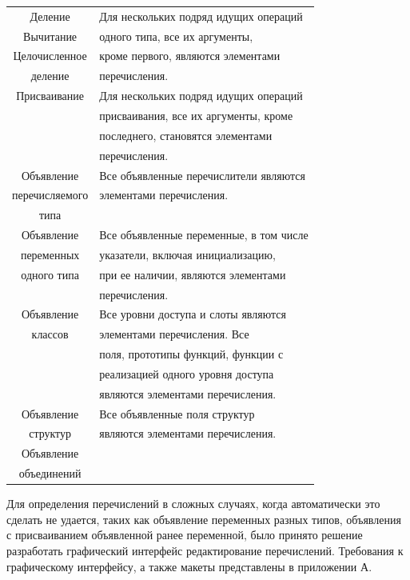 \documentclass[a4paper,english,russian]{G2-105}
\begin{document}
\begin{longtable}{|c|l|}
    Деление           & Для нескольких подряд идущих операций \\ \cline{1-1}
    Вычитание         & одного типа, все их аргументы, \\ \cline{1-1}
    Целочисленное     & кроме первого, являются элементами \\  
    деление           & перечисления.\\ \hline
    Присваивание      & Для нескольких подряд идущих операций \\
                      & присваивания, все их аргументы, кроме \\
                      & последнего, становятся элементами \\
                      & перечисления.  \\ \hline
    Объявление        & Все объявленные перечислители являются \\
    перечисляемого    & элементами перечисления. \\  
    типа              & \\ \hline 
    Объявление        & Все объявленные переменные, в том числе \\
    переменных        & указатели, включая инициализацию, \\
    одного типа       & при ее наличии, являются элементами \\
                      & перечисления. \\  \hline 
    Объявление        & Все уровни доступа и слоты являются \\
    классов           & элементами перечисления. Все \\ 
                      & поля, прототипы функций, функции с \\
                      & реализацией одного уровня доступа \\
                      & являются элементами перечисления. \\ \hline 
    Объявление        & Все объявленные поля структур \\
    структур         & являются элементами перечисления.\\  \cline{1-1}
    Объявление        & \\
    объединений       & \\   
\end{longtable}
\par Для определения перечислений в сложных случаях, когда автоматически это сделать не удается, таких как объявление переменных разных типов, объявления с присваиванием объявленной ранее переменной, было принято решение разработать графический интерфейс редактирование перечислений. Требования к графическому интерфейсу, а также макеты представлены в приложении А. 
\end{document}
